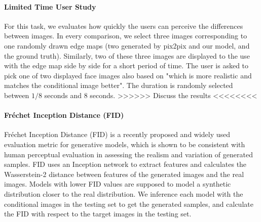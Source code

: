 \paragraph{Limited Time User Study}
For this task, we evaluates how quickly the users can perceive the differences between images. In every comparison, we  select three images corresponding to one randomly drawn edge maps (two generated by pix2pix and our model, and the ground truth). Similarly, two of these three images are displayed to the use with the edge map side by side for a short period of time. The user is asked to pick one of two displayed face images also based on "which is more realistic and matches the conditional image better". The duration is randomly selected between $1/8$ seconds and $8$ seconds. 
>>>>>> Discuss the results <<<<<<<<
\paragraph{Fr\'echet Inception Distance (FID)}
Fr\'echet Inception Distance (FID) \cite{FID} is a recently proposed and widely used evaluation metric for generative models, which is shown to be consistent with human perceptual evaluation in assessing the realism and variation of generated samples. FID uses an Inception network to extract features and calculates the Wasserstein-2 distance between features of the generated images and the real images. Models with lower FID values are supposed to model a synthetic distribution closer to the real distribution. We inference each model with the conditional images in the testing set to get the generated samples, and calculate the FID with respect to the target images in the testing set.
%
%
